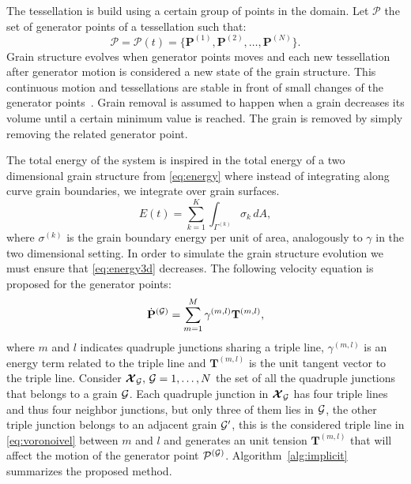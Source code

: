 The tessellation is build using a certain group of points in the domain. Let $\mathcal{P}$ the set of generator points of a tessellation such that:
\begin{equation*}
    \mathcal{P} = \mathcal{P}(t) = \{ \mathbf{P}^{(1)}, \mathbf{P}^{(2)}, \dotsc, \mathbf{P}^{(N)} \}.
\end{equation*}
Grain structure evolves when generator points moves and each new tessellation after generator motion is considered a new state of the grain structure. 
This continuous motion and tessellations are stable in front of small changes of the generator points~\cite{reem2011geometric}. 
Grain removal is assumed to happen when a grain decreases its volume until a certain minimum value is reached. 
The grain is removed by simply removing the related generator point.

The total energy of the system is inspired in the total energy of a two dimensional grain structure from \eqref{eq:energy} where instead of integrating along curve grain boundaries, we integrate over grain surfaces.
\begin{equation}
    E(t) = \sum_{k=1}^{K} \int_{\Gamma^{(k)}} \sigma_k\,dA,
    \label{eq:energy3d}
\end{equation}
where $\sigma^{(k)}$ is the grain boundary energy per unit of area, analogously to $\gamma$ in the two dimensional setting. 
In order to simulate the grain structure evolution we must ensure that \eqref{eq:energy3d} decreases. The following velocity equation is proposed for the generator points:
\begin{equation}
    \dot{\mathbf{P}}^{(\mathcal{G})} = \sum_{m=1}^{M} \gamma^{(m,l)}\mathbf{T}^{(m,l)},
    \label{eq:voronoivel}
\end{equation}
where $m$ and $l$ indicates quadruple junctions sharing a triple line, $\gamma^{(m,l)}$ is an energy term related to the triple line and $\mathbf{T}^{(m,l)}$ is the unit tangent vector to the triple line. 
Consider $\bm{\mathcal{X}}_{\mathcal{G}},\, \mathcal{G} = 1,\dotsc,N$ the set of all the quadruple junctions that belongs to a grain $\mathcal{G}$. 
Each quadruple junction in $\bm{\mathcal{X}}_{\mathcal{G}}$ has four triple lines and thus four neighbor junctions, but only three of them lies in $\mathcal{G}$, the other triple junction belongs to an adjacent grain $\mathcal{G}'$, this is the considered triple line in \eqref{eq:voronoivel} between $m$ and $l$ and generates an unit tension $\mathbf{T}^{(m,l)}$ that will affect the motion of the generator point $\mathcal{P}^{(\mathcal{G})}$. Algorithm~\ref{alg:implicit} summarizes the proposed method.


